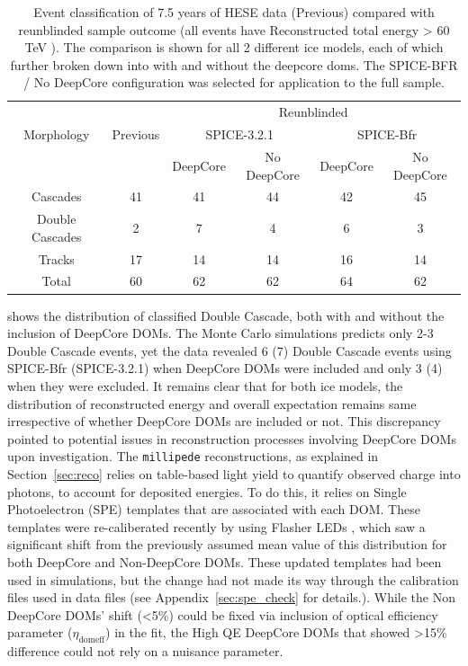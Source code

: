 \begin{table}[h]
    \caption[Event classification of 7.5 years of HESE data]{Event classification of 7.5 years of HESE data (Previous) compared with reunblinded sample outcome (all events have Reconstructed total energy > 60 TeV ). The comparison is shown for all 2 different ice models, each of which further broken down into with and without the deepcore doms. The SPICE-BFR / No DeepCore configuration was selected for application to the full sample.}
    \raggedright
    \begin{tabular}{ c|c|c c |cc}
        \toprule
            & & \multicolumn{4}{c}{Reunblinded}\\
            
           Morphology&Previous & \multicolumn{2}{c|}{SPICE-3.2.1} & \multicolumn{2}{c}{SPICE-Bfr}\\
           
                     &   & DeepCore & No DeepCore & DeepCore & No DeepCore\\
                                
        \hline
        Cascades & 41 & 41 & 44 &42&45 \\
        Double Cascades & 2 & 7 &4&6& 3 \\
        Tracks& 17&14&14&16&14\\
        \hline
        Total & 60 & 62 &62&64&62\\
        \bottomrule
\end{tabular}
\end{table}
 shows the distribution of classified Double Cascade, both with and without the inclusion of DeepCore DOMs. The Monte Carlo simulations predicts only 2-3 Double Cascade events, yet the data revealed 6 (7) Double Cascade events using SPICE-Bfr (SPICE-3.2.1) when DeepCore DOMs were included and only 3 (4) when they were excluded. It remains clear that for both ice models, the distribution of reconstructed energy and overall expectation remains same irrespective of whether DeepCore DOMs are included or not. This discrepancy pointed to potential issues in reconstruction processes involving DeepCore DOMs upon investigation. The \texttt{millipede} reconstructions, as explained in Section~\ref{sec:reco} relies on table-based light yield to quantify observed charge into photons, to account for deposited energies. To do this, it relies on Single Photoelectron (SPE) templates that are associated with each DOM. These templates were re-caliberated recently by using Flasher LEDs , which saw a significant shift from the previously assumed mean value of this distribution for both DeepCore and Non-DeepCore DOMs. These updated templates had been used in simulations, but the change had not made its way through the calibration files used in data files (see Appendix~\ref{sec:spe_check} for details.). While the Non DeepCore DOMs' shift (<5\%) could be fixed via inclusion of optical efficiency parameter ($\eta_{\mathrm{domeff}}$) in the fit, the High QE DeepCore DOMs that showed >15\% difference could not rely on a nuisance parameter.  

